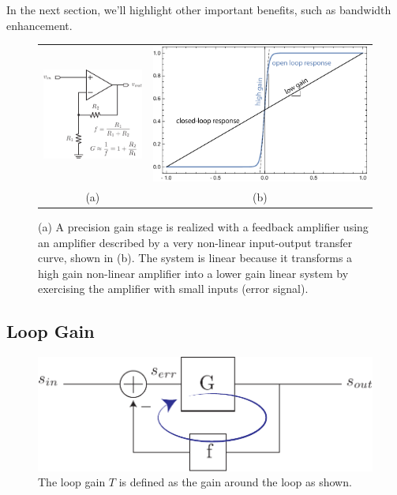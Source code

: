 In the next section, we'll highlight other important benefits, such as bandwidth enhancement.  
\begin{figure}[tb]
\begin{center}
\begin{tabular}{cc}
\includegraphics[width=.25\columnwidth]{opamp_fb_precise} &
\includegraphics[width=.75\columnwidth]{opamp_gain} \\
(a) & (b) 
\end{tabular}
\end{center}
\caption{(a)  A precision gain stage is realized with a feedback amplifier using an amplifier described by a very non-linear input-output transfer curve, shown in (b).  The system is linear because it transforms a high gain non-linear amplifier into a lower gain linear system by exercising the amplifier with small inputs (error signal).}
\label{fig:opamp_fb_precise}
\end{figure}
\subsection{Loop Gain}
\begin{figure}[tb]
\begin{center}
\includegraphics[scale=.7]{fbblock_loopgain}
\end{center}
\caption{The loop gain $T$ is defined as the gain around the loop as shown.} \label{fig:fbblock_loopgain}
\end{figure}


